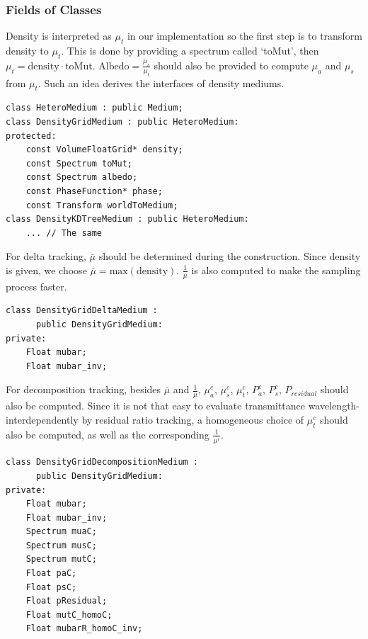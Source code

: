 \documentclass[acmtog]{acmart}
\begin{document}
\subsubsection{Fields of Classes}
    Density is interpreted as $\mu_t$ in our implementation so the first step is to transform density to $\mu_t$.
    This is done by providing a spectrum called `toMut', then $\mu_t=\mathrm{density\cdot toMut}$.
    $\mathrm{Albedo}=\frac{\mu_s}{\mu_t}$ should also be provided to compute $\mu_a$ and $\mu_s$ from $\mu_t$.
    Such an idea derives the interfaces of density mediums.
\begin{lstlisting}
class HeteroMedium : public Medium;
class DensityGridMedium : public HeteroMedium:
protected:
    const VolumeFloatGrid* density;
    const Spectrum toMut;
    const Spectrum albedo;
    const PhaseFunction* phase;
    const Transform worldToMedium;
class DensityKDTreeMedium : public HeteroMedium:
    ... // The same
\end{lstlisting}
    For delta tracking, $\bar{\mu}$ should be determined during the construction.
    Since density is given, we choose $\bar{\mu}=\mathrm{max}(\mathrm{density})$.
    $\frac{1}{\bar{\mu}}$ is also computed to make the sampling process faster.
\begin{lstlisting}
class DensityGridDeltaMedium : 
      public DensityGridMedium:
private:
    Float mubar;
    Float mubar_inv;
\end{lstlisting}
    For decomposition tracking, besides $\bar{\mu}$ and $\frac{1}{\bar{\mu}}$, 
    $\mu_a^c$, $\mu_s^c$, $\mu_t^c$, $P_a^c$, $P_s^c$, $P_{residual}$ should also be computed.
    Since it is not that easy to evaluate transmittance wavelength-interdependently by residual ratio tracking, 
    a homogeneous choice of $\mu_t^c$ should also be computed, as well as the corresponding $\frac{1}{\bar{\mu^r}}$.
\begin{lstlisting}
class DensityGridDecompositionMedium : 
      public DensityGridMedium:
private:
    Float mubar;
    Float mubar_inv;
    Spectrum muaC;
    Spectrum musC;
    Spectrum mutC;
    Float paC;
    Float psC;
    Float pResidual;
    Float mutC_homoC;
    Float mubarR_homoC_inv;
\end{lstlisting}
\end{document}
